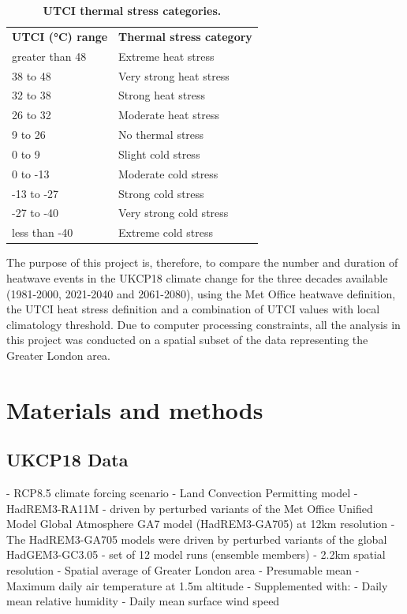 \documentclass[10pt,letterpaper]{article}
\newlength\savedwidth
\newcommand\thickhline{\noalign{\global\savedwidth\arrayrulewidth\global\arrayrulewidth 2pt}%
\hline
\noalign{\global\arrayrulewidth\savedwidth}}
\begin{document}
\begin{table}[]
\centering
\caption{
{\bf UTCI thermal stress categories.\cite{Blazejczyk2012}}}
\begin{tabular}{|l|l|}
\hline
\textbf{UTCI (°C) range} & \textbf{Thermal stress category} \\ \thickhline
greater than 48 & Extreme heat stress     \\ \hline
38 to 48        & Very strong heat stress \\ \hline
32 to 38        & Strong heat stress      \\ \hline
26 to 32        & Moderate heat stress    \\ \hline
9 to 26         & No thermal stress       \\ \hline
0 to 9          & Slight cold stress      \\ \hline
0 to -13        & Moderate cold stress    \\ \hline
-13 to -27      & Strong cold stress      \\ \hline
-27 to -40      & Very strong cold stress \\ \hline
less than -40   & Extreme cold stress     \\ \hline
\end{tabular}
\label{utci-table}
\end{table}


The purpose of this project is, therefore, to compare the number and duration of heatwave events in the UKCP18 climate change for the three decades available (1981-2000, 2021-2040 and 2061-2080), using the Met Office heatwave definition, the UTCI heat stress definition and a combination of UTCI values with local climatology threshold.
Due to computer processing constraints, all the analysis in this project was conducted on a spatial subset of the data representing the Greater London area.


\pagebreak

\section*{Materials and methods}

\subsection*{UKCP18 Data}

- RCP8.5 climate forcing scenario
- Land Convection Permitting model
    - HadREM3-RA11M
    - driven by perturbed variants of the Met Office Unified Model Global Atmosphere GA7 model (HadREM3-GA705) at 12km resolution
    - The HadREM3-GA705 models were driven by perturbed variants of the global HadGEM3-GC3.05
- set of 12 model runs (ensemble members)
- 2.2km spatial resolution
    - Spatial average of Greater London area
    - Presumable mean
- Maximum daily air temperature at 1.5m altitude
- Supplemented with:
    - Daily mean relative humidity
    - Daily mean surface wind speed
\end{document}
